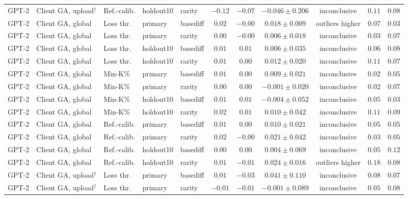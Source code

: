 {\begin{longtable}{@{\extracolsep{\fill}}lllllcccccc@{}}
GPT-2 & Client GA, upload$^{\dagger}$ & Ref.-calib. & holdout10 & rarity & $-0.12$ & $-0.07$ & $-0.046 \pm 0.206$ & inconclusive & $0.11$ & $0.08$ \\
GPT-2 & Client GA, global & Loss thr. & primary & basediff & $0.02$ & $-0.00$ & $0.018 \pm 0.009$ & outliers higher & $0.07$ & $0.03$ \\
GPT-2 & Client GA, global & Loss thr. & primary & rarity & $0.00$ & $-0.00$ & $0.006 \pm 0.018$ & inconclusive & $0.03$ & $0.07$ \\
GPT-2 & Client GA, global & Loss thr. & holdout10 & basediff & $0.01$ & $0.01$ & $0.006 \pm 0.035$ & inconclusive & $0.06$ & $0.08$ \\
GPT-2 & Client GA, global & Loss thr. & holdout10 & rarity & $0.01$ & $0.00$ & $0.012 \pm 0.020$ & inconclusive & $0.11$ & $0.07$ \\
GPT-2 & Client GA, global & Min-K\% & primary & basediff & $0.01$ & $0.00$ & $0.009 \pm 0.021$ & inconclusive & $0.02$ & $0.05$ \\
GPT-2 & Client GA, global & Min-K\% & primary & rarity & $0.00$ & $0.00$ & $-0.001 \pm 0.020$ & inconclusive & $0.02$ & $0.07$ \\
GPT-2 & Client GA, global & Min-K\% & holdout10 & basediff & $0.01$ & $0.01$ & $-0.004 \pm 0.052$ & inconclusive & $0.05$ & $0.03$ \\
GPT-2 & Client GA, global & Min-K\% & holdout10 & rarity & $0.02$ & $0.01$ & $0.010 \pm 0.042$ & inconclusive & $0.11$ & $0.09$ \\
GPT-2 & Client GA, global & Ref.-calib. & primary & basediff & $0.01$ & $0.00$ & $0.010 \pm 0.021$ & inconclusive & $0.05$ & $0.05$ \\
GPT-2 & Client GA, global & Ref.-calib. & primary & rarity & $0.02$ & $-0.00$ & $0.021 \pm 0.042$ & inconclusive & $0.03$ & $0.05$ \\
GPT-2 & Client GA, global & Ref.-calib. & holdout10 & basediff & $0.00$ & $0.00$ & $0.004 \pm 0.069$ & inconclusive & $0.05$ & $0.12$ \\
GPT-2 & Client GA, global & Ref.-calib. & holdout10 & rarity & $0.01$ & $-0.01$ & $0.024 \pm 0.016$ & outliers higher & $0.18$ & $0.08$ \\
GPT-2 & Client GA, upload$^{\dagger}$ & Loss thr. & primary & basediff & $0.01$ & $-0.03$ & $0.041 \pm 0.110$ & inconclusive & $0.08$ & $0.07$ \\
GPT-2 & Client GA, upload$^{\dagger}$ & Loss thr. & primary & rarity & $-0.01$ & $-0.01$ & $-0.001 \pm 0.089$ & inconclusive & $0.05$ & $0.08$ \\

\end{longtable}}
